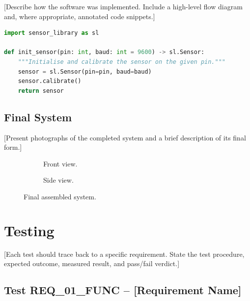 \documentclass[12pt, a4paper]{report}
\begin{document}
[Describe how the software was implemented. Include a high-level
flow diagram and, where appropriate, annotated code snippets.]

\begin{lstlisting}[language=Python, caption={Example: sensor initialisation routine.}, label=lst:sensor-init]
import sensor_library as sl

def init_sensor(pin: int, baud: int = 9600) -> sl.Sensor:
    """Initialise and calibrate the sensor on the given pin."""
    sensor = sl.Sensor(pin=pin, baud=baud)
    sensor.calibrate()
    return sensor
\end{lstlisting}

\section{Final System}
\label{sec:final-system}

[Present photographs of the completed system and a brief description
of its final form.]

\begin{figure}[H]
    \centering
    \begin{subfigure}[b]{0.45\textwidth}
        \caption{Front view.}
    \end{subfigure}
    \hfill
    \begin{subfigure}[b]{0.45\textwidth}
        \caption{Side view.}
    \end{subfigure}
    \caption{Final assembled system.}
    \label{fig:final-system}
\end{figure}

\chapter{Testing}
\label{ch:testing}

[Each test should trace back to a specific requirement. State the
test procedure, expected outcome, measured result, and pass/fail
verdict.]

\section{Test REQ\_01\_FUNC – [Requirement Name]}
\label{sec:test-req01}
\end{document}
